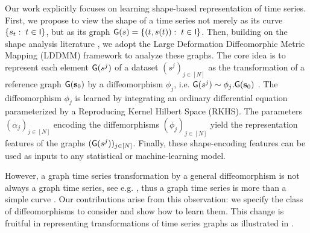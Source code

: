 Our work explicitly focuses on learning shape-based representation of time series.
First, we propose to view the shape of a time series not merely as its curve $\{s_t:\; t\in\mathsf{I}\}$, but as its graph $\mathsf{G}(s)=\{(t,s(t)):\; t\in \mathsf{I}\}$.
   Then, building on the shape analysis literature \cite{beg2005computing,vaillant2004statistics}, we adopt the Large Deformation Diffeomorphic Metric Mapping (LDDMM) framework \cite{beg2005computing,vaillant2004statistics} to analyze these graphs.
    The core idea is to represent each element $\mathsf{G}(s^j)$ of a dataset $(s^j)_{j\in[N]}$ as the transformation of a reference graph $\mathsf{G}(\mathbf{s}_0)$ by a diffeomorphism $\phi_j$, i.e. $\mathsf{G}(s^j) \sim \phi_j . \mathsf{G}(\mathbf{s}_0)$ .
    The diffeomorphism $\phi_j$ is learned by integrating an ordinary differential equation parameterized by a Reproducing Kernel Hilbert Space (RKHS).
     The parameters $(\alpha_j)_{j\in[N]}$ encoding the diffemorphisms $(\phi_j)_{j\in[N]}$ yield the representation features of the graphs $(\mathsf{G}(s^j))_{j\in[N]}$.
     Finally, these shape-encoding features can be used as inputs to any statistical or machine-learning model.

     
However, a graph time series transformation by a general diffeomorphism is not always a graph time series, see e.g. , thus a graph time series is more than a simple curve \cite{glaunes2008large}.
 Our contributions arise from this observation: we specify the class of diffeomorphisms to consider and show how to learn them.
  This change is fruitful in representing transformations of time series graphs as illustrated in .


        

